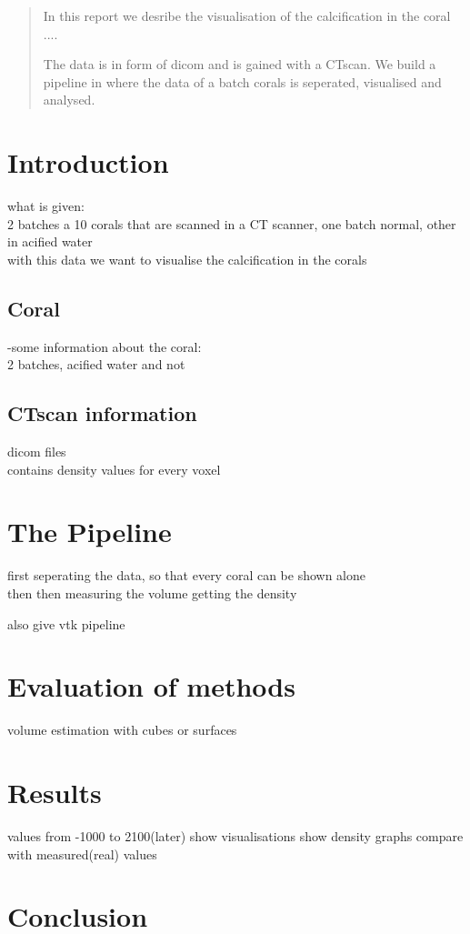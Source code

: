 \documentclass[12pt]{article}
\author{Kristin Rieping (10252428) \and Toby \and Mihai \and Robrecht}
\date{today}
\begin{document}
\maketitle

\begin{abstract}
In this report we desribe the visualisation of the calcification in the coral .... 

The data is in form of dicom and is gained with a CTscan. We build a pipeline in where the data of a batch corals is seperated, visualised and analysed.
\end{abstract}

\section{Introduction}
what is given:\\
2 batches a 10 corals that are scanned in a CT scanner, one batch normal, other in acified water\\
with this data we want to visualise the calcification in the corals\\


\subsection{Coral}
-some information about the coral:\\
2 batches, acified water and not

\subsection{CTscan information}

dicom files\\
contains density values for every voxel\\


\section{The Pipeline}
first seperating the data, so that every coral can be shown alone\\
then then measuring the volume
getting the density 

also give vtk pipeline

\section{Evaluation of methods}
volume estimation with cubes or surfaces

\section{Results}
values from -1000 to 2100(later)
show visualisations
show density graphs
compare with measured(real) values
\section{Conclusion}
\end{document}
